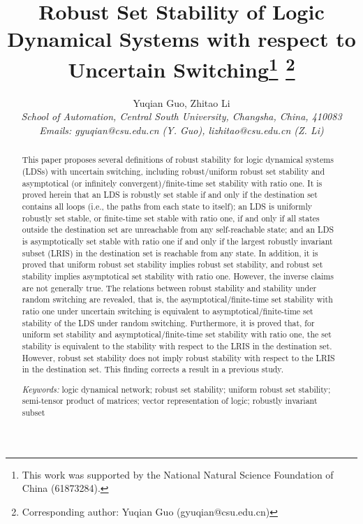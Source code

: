 \documentclass[11pt,onecolumn]{article}
\begin{document}
\title{\bf Robust Set Stability of Logic Dynamical Systems with respect to Uncertain Switching\thanks{This work was supported by the National Natural Science Foundation of China (61873284).}
\thanks{Corresponding author: Yuqian Guo (gyuqian@csu.edu.cn)}}
\author{Yuqian Guo, Zhitao Li\vspace{0.2cm}\\\vspace{0.1cm}\it  School of Automation, Central South University, Changsha, China, 410083\\\small Emails: gyuqian@csu.edu.cn (Y. Guo), lizhitao@csu.edu.cn (Z. Li)}

\date{}

\maketitle

\begin{abstract}
This paper proposes several definitions of robust stability for logic dynamical systems (LDSs) with uncertain switching, including robust/uniform robust set stability and asymptotical (or infinitely convergent)/finite-time set stability with ratio one. It is proved herein that an LDS is robustly set stable if and only if the destination set contains all loops (i.e., the paths from each state to itself); an LDS is uniformly robustly set stable, or finite-time set stable with ratio one, if and only if all states outside the destination set are unreachable from any self-reachable state; and an LDS is asymptotically set stable with ratio one if and only if the largest robustly invariant subset (LRIS) in the destination set is reachable from any state. In addition, it is proved that uniform robust set stability implies robust set stability, and robust set stability implies asymptotical set stability with ratio one. However, the inverse claims are not generally true. The relations between robust stability and stability under random switching are revealed, that is, the asymptotical/finite-time set stability with ratio one under uncertain switching is equivalent to asymptotical/finite-time set stability of the LDS under random switching. Furthermore, it is proved that, for uniform set stability and asymptotical/finite-time set stability with ratio one, the set stability is equivalent to the stability with respect to the LRIS in the destination set. However, robust set stability does not imply robust stability with respect to the LRIS in the destination set. This finding corrects a result in a previous study.

{\it Keywords:} logic dynamical network; robust set stability; uniform robust set stability; semi-tensor product of matrices; vector representation of logic; robustly invariant subset
\end{abstract}
\end{document}
